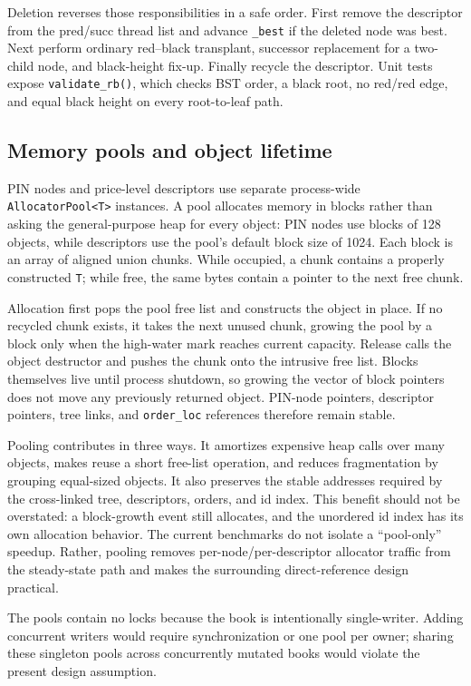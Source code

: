 \documentclass[10pt,twocolumn]{article}
\begin{document}
Deletion reverses those responsibilities in a safe order.  First remove the
descriptor from the pred/succ thread list and advance \texttt{\_best} if the
deleted node was best.  Next perform ordinary red--black transplant, successor
replacement for a two-child node, and black-height fix-up.  Finally recycle the
descriptor.  Unit tests expose \texttt{validate\_rb()}, which checks BST order,
a black root, no red/red edge, and equal black height on every root-to-leaf path.

\subsection{Memory pools and object lifetime}

PIN nodes and price-level descriptors use separate process-wide
\texttt{AllocatorPool<T>} instances.  A pool allocates memory in blocks rather
than asking the general-purpose heap for every object: PIN nodes use blocks of
128 objects, while descriptors use the pool's default block size of 1024.  Each
block is an array of aligned union chunks.  While occupied, a chunk contains a
properly constructed \texttt{T}; while free, the same bytes contain a pointer to
the next free chunk.

Allocation first pops the pool free list and constructs the object in place.  If
no recycled chunk exists, it takes the next unused chunk, growing the pool by a
block only when the high-water mark reaches current capacity.  Release calls the
object destructor and pushes the chunk onto the intrusive free list.  Blocks
themselves live until process shutdown, so growing the vector of block pointers
does not move any previously returned object.  PIN-node pointers, descriptor
pointers, tree links, and \texttt{order\_loc} references therefore remain stable.

Pooling contributes in three ways.  It amortizes expensive heap calls over many
objects, makes reuse a short free-list operation, and reduces fragmentation by
grouping equal-sized objects.  It also preserves the stable addresses required
by the cross-linked tree, descriptors, orders, and id index.  This benefit should
not be overstated: a block-growth event still allocates, and the unordered id
index has its own allocation behavior.  The current benchmarks do not isolate a
``pool-only'' speedup.  Rather, pooling removes per-node/per-descriptor allocator
traffic from the steady-state path and makes the surrounding direct-reference
design practical.

The pools contain no locks because the book is intentionally single-writer.
Adding concurrent writers would require synchronization or one pool per owner;
sharing these singleton pools across concurrently mutated books would violate
the present design assumption.
\end{document}
